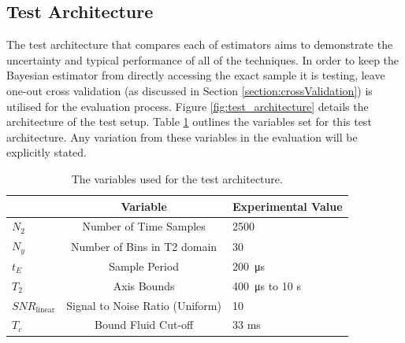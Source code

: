 \subsection{Test Architecture}
The test architecture that compares each of estimators aims to demonstrate the uncertainty and typical performance of all of the techniques. In order to keep the Bayesian estimator from directly accessing the exact sample it is testing, leave one-out cross validation (as discussed in Section \ref{section:crossValidation}) is utilised for the evaluation process. Figure \ref{fig:test_architecture} details the architecture of the test setup. Table \ref{tab:test_variables} outlines the variables set for this test architecture. Any variation from these variables in the evaluation will be explicitly stated.


\begin{table}[h]
    \centering
    \begin{tabular}{l c l}
        \toprule
         & Variable  &     \hfill   Experimental Value \\
        \midrule
        $N_2$ & Number of Time Samples & 2500 \\
        $N_y$ & Number of Bins in T2 domain & 30 \\
        $t_E$ & Sample Period & \SI{200}{\micro\second}\\
        $T_2$ & Axis Bounds & \SI{400}{\micro\second} to 10 s \\
        $SNR_{\text{linear}}$ & Signal to Noise Ratio (Uniform) & 10 \\
        $T_c$ & Bound Fluid Cut-off & 33 ms \\
        \bottomrule
    \end{tabular}
    \caption{The variables used for the test architecture.}
    \label{tab:test_variables}
\end{table}



